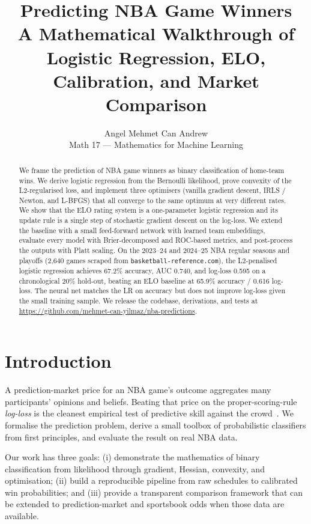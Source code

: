 \documentclass[11pt]{article}
\title{\textbf{Predicting NBA Game Winners}\\
\large A Mathematical Walkthrough of Logistic Regression, ELO,
Calibration, and Market Comparison}
\author{Angel \quad Mehmet Can \quad Andrew\\
\small Math 17 --- Mathematics for Machine Learning}
\date{}
\begin{document}
\maketitle

\begin{abstract}
We frame the prediction of NBA game winners as binary classification of
home-team wins. We derive logistic regression from the Bernoulli
likelihood, prove convexity of the L2-regularised loss, and implement
three optimisers (vanilla gradient descent, IRLS / Newton, and L-BFGS)
that all converge to the same optimum at very different rates. We show
that the ELO rating system is a one-parameter logistic regression and
its update rule is a single step of stochastic gradient descent on the
log-loss. We extend the baseline with a small feed-forward network with
learned team embeddings, evaluate every model with Brier-decomposed and
ROC-based metrics, and post-process the outputs with Platt scaling. On
the 2023--24 and 2024--25 NBA regular seasons and playoffs (2{,}640
games scraped from \texttt{basketball-reference.com}), the L2-penalised
logistic regression achieves 67.2\% accuracy, AUC 0.740, and log-loss
0.595 on a chronological 20\% hold-out, beating an ELO baseline at
65.9\% accuracy / 0.616 log-loss. The neural net matches the LR on
accuracy but does not improve log-loss given the small training sample.
We release the codebase, derivations, and tests at
\url{https://github.com/mehmet-can-yilmaz/nba-predictions}.
\end{abstract}

\section{Introduction}

A prediction-market price for an NBA game's outcome aggregates many
participants' opinions and beliefs. Beating that price on the
proper-scoring-rule \emph{log-loss} is the cleanest empirical test of
predictive skill against the crowd~\cite{levitt2004gambling,
silver2015fivethirtyeight}. We formalise the prediction problem,
derive a small toolbox of probabilistic classifiers from first
principles, and evaluate the result on real NBA data.

Our work has three goals: (i) demonstrate the mathematics of binary
classification from likelihood through gradient, Hessian, convexity, and
optimisation; (ii) build a reproducible pipeline from raw schedules to
calibrated win probabilities; and (iii) provide a transparent
comparison framework that can be extended to prediction-market and
sportsbook odds when those data are available.
\end{document}
